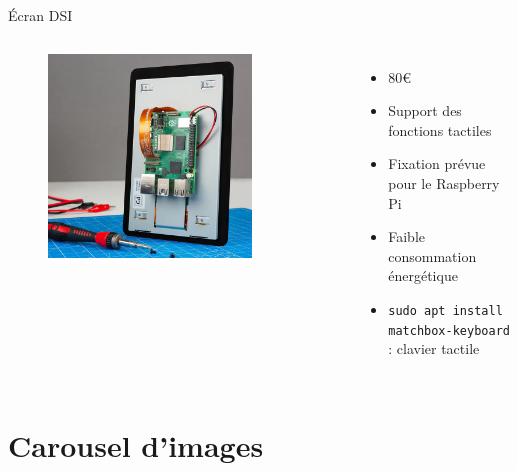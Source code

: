 \documentclass[aspectratio=169,xcolor=dvipsnames]{beamer}
\begin{document}
\begin{frame}{Écran DSI}
    \begin{columns}[c] %

        \begin{figure}
            \includegraphics[width=0.8\textwidth]{images/display-dsi.png}
        \end{figure}

        \begin{itemize}
            \item 80€
            \item Support des fonctions tactiles
            \item Fixation prévue pour le Raspberry Pi
            \item Faible consommation énergétique
            \item \texttt{sudo apt install matchbox-keyboard} : clavier tactile
        \end{itemize}

    \end{columns}
\end{frame}

\section{Carousel d'images}
\end{document}
